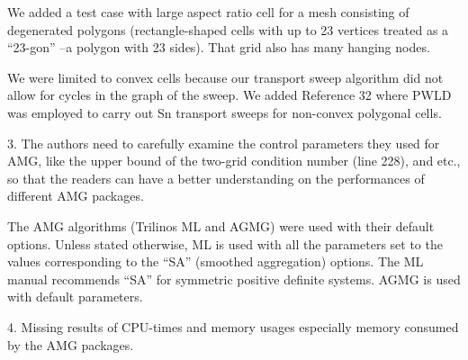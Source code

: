 \documentclass{article}
\begin{document}
We added a test case with large aspect ratio cell for a mesh consisting of degenerated polygons (rectangle-shaped cells with up to 23 vertices treated as a ``23-gon'' --a polygon with 23 sides). That grid also has many hanging nodes.

We were limited to convex cells because our transport sweep algorithm did not allow for cycles in the graph of the sweep. We added Reference 32 where PWLD was employed to carry out Sn transport sweeps for non-convex polygonal cells. 

\bigskip


{
\color{blue}
3. The authors need to carefully examine the control parameters they used for AMG, like the upper bound of the two-grid condition number (line 228), and etc., so that the readers can have a better understanding on the performances of different AMG packages.
}

The AMG algorithms (Trilinos ML and AGMG) were used with their default options. Unless stated otherwise, ML is
used with all the parameters set to the values corresponding to the ``SA'' (smoothed aggregation) options. The ML manual recommends ``SA'' for symmetric positive definite systems. AGMG is used with default parameters. 


\bigskip


{
\color{blue}
4. Missing results of CPU-times and memory usages especially memory consumed by the AMG packages.
}
\end{document}
